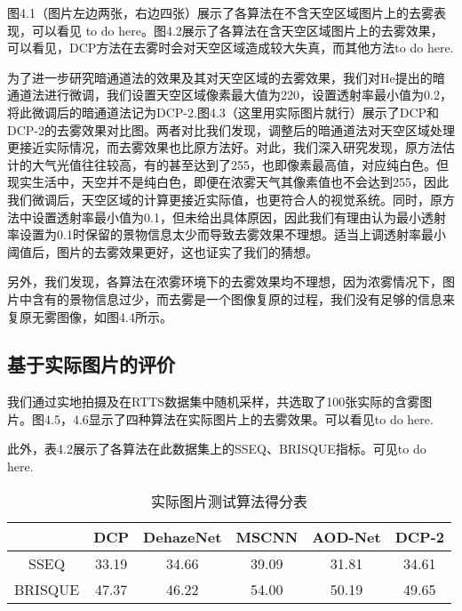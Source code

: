 \documentclass[a4paper, 12pt, oneside]{report}
\begin{document}
{图4.1（图片左边两张，右边四张）展示了各算法在不含天空区域图片上的去雾表现，可以看见 to do here。图4.2展示了各算法在含天空区域图片上的去雾效果，可以看见，DCP方法在去雾时会对天空区域造成较大失真，而其他方法to do here.

为了进一步研究暗通道法的效果及其对天空区域的去雾效果，我们对He提出的暗通道法进行微调，我们设置天空区域像素最大值为220，设置透射率最小值为0.2，将此微调后的暗通道法记为DCP-2.图4.3（这里用实际图片就行）展示了DCP和DCP-2的去雾效果对比图。两者对比我们发现，调整后的暗通道法对天空区域处理更接近实际情况，而去雾效果也比原方法好。对此，我们深入研究发现，原方法估计的大气光值往往较高，有的甚至达到了255，也即像素最高值，对应纯白色。但现实生活中，天空并不是纯白色，即便在浓雾天气其像素值也不会达到255，因此我们微调后，天空区域的计算更接近实际值，也更符合人的视觉系统。同时，原方法中设置透射率最小值为0.1，但未给出具体原因，因此我们有理由认为最小透射率设置为0.1时保留的景物信息太少而导致去雾效果不理想。适当上调透射率最小阈值后，图片的去雾效果更好，这也证实了我们的猜想。

另外，我们发现，各算法在浓雾环境下的去雾效果均不理想，因为浓雾情况下，图片中含有的景物信息过少，而去雾是一个图像复原的过程，我们没有足够的信息来复原无雾图像，如图4.4所示。

\subsection{基于实际图片的评价\quad}
我们通过实地拍摄及在RTTS数据集中随机采样，共选取了100张实际的含雾图片。图4.5，4.6显示了四种算法在实际图片上的去雾效果。可以看见to do here.

此外，表4.2展示了各算法在此数据集上的SSEQ、BRISQUE指标。可见to do here.
\begin{table}[htbp]
  \centering
  \caption{实际图片测试算法得分表}
    \begin{tabular}{c|c|c|c|c|c}
    \hline
         & DCP    & DehazeNet  & MSCNN    & AOD-Net &DCP-2 \\
    \hline
    SSEQ & 33.19  & 34.66 &   39.09  & 31.81 & 34.61\\
    \hline
     BRISQUE     &     47.37  &  46.22     &  54.00 & 50.19 & 49.65  \\
     \hline
  
    \end{tabular}%
  \label{tab:4.2}%
\end{table}%

}
\end{document}
